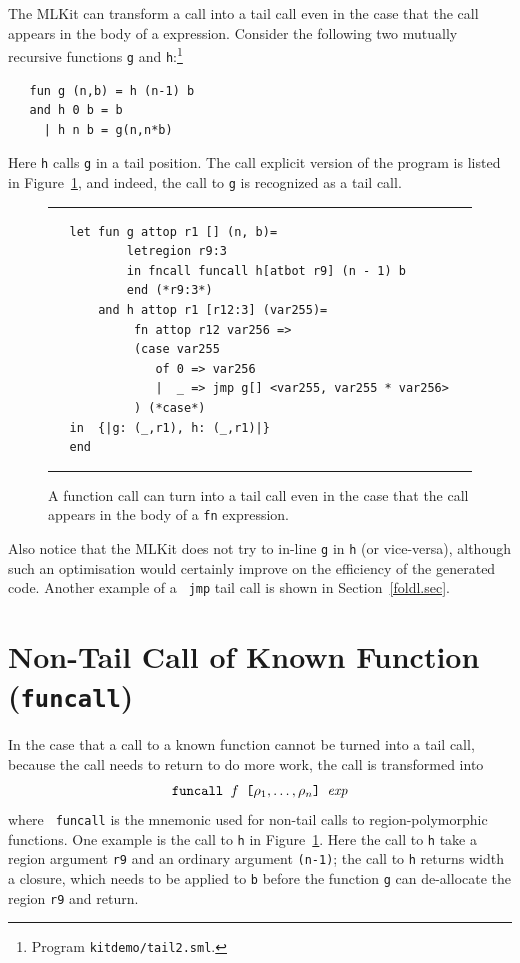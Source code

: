 \documentclass[12pt]{book}
\begin{document}
The MLKit can transform a call into a  tail call even in the
case that the call appears in the body of a  expression.
Consider the following two mutually recursive functions {\tt g} and
{\tt h}:\footnote{Program {\tt kitdemo/tail2.sml}.}
\begin{verbatim}
   fun g (n,b) = h (n-1) b
   and h 0 b = b
     | h n b = g(n,n*b)
\end{verbatim}
Here {\tt h} calls {\tt g} in a tail position. The call explicit
version of the program is listed in Figure~\ref{tail2.fig}, and
indeed, the call to {\tt g} is recognized as a tail call.
\begin{figure}
\hrule \medskip
\begin{verbatim}
   let fun g attop r1 [] (n, b)= 
           letregion r9:3 
           in fncall funcall h[atbot r9] (n - 1) b 
           end (*r9:3*)
       and h attop r1 [r12:3] (var255)= 
            fn attop r12 var256 => 
            (case var255 
               of 0 => var256
               |  _ => jmp g[] <var255, var255 * var256>
            ) (*case*) 
   in  {|g: (_,r1), h: (_,r1)|}
   end 
\end{verbatim}
\caption{A function call can turn into a tail call even 
  in the case that the call appears in the body of a {\tt fn} expression.}  
\medskip \hrule
\label{tail2.fig}
\end{figure}
Also notice that the MLKit does not try to in-line {\tt g} in {\tt h}
(or vice-versa), although such an optimisation would certainly improve
on the efficiency of the generated code. Another example of a {\tt
  jmp} tail call is shown in Section~\ref{foldl.sec}.

\section{Non-Tail Call of Known Function (\texttt{funcall})}
In the case that a call to a known function cannot be turned into a
tail call, because the call needs to return to do more work, the call
is transformed into
$$\hbox{\tt funcall $f$ [$\rho_1, \ldots, \rho_n$] $\hbox{\it exp}$}$$
where {\tt
  funcall} is the mnemonic used for non-tail calls to
region-polymorphic functions. One example is the call to {\tt h} in
Figure~\ref{tail2.fig}. Here the call to {\tt h} take a region
argument {\tt r9} and an ordinary argument {\tt (n-1)}; the call to
{\tt h} returns width a closure, which needs to be applied to {\tt b}
before the function {\tt g} can de-allocate the region {\tt r9} and
return.
\end{document}
